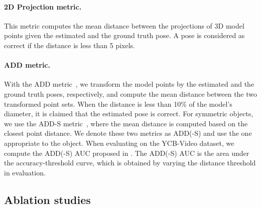 \documentclass[10pt,twocolumn,letterpaper]{article}
\begin{document}
\paragraph{2D Projection metric.} This metric computes the mean distance between the projections of 3D model points given the estimated and the ground truth pose. A pose is considered as correct if the distance is less than 5 pixels.

\paragraph{ADD metric.} With the ADD metric~\cite{hinterstoisser2012model}, we transform the model points by the estimated and the ground truth poses, respectively, and compute the mean distance between the two transformed point sets. When the distance is less than 10\% of the model's diameter, it is claimed that the estimated pose is correct. For symmetric objects, we use the ADD-S metric~\cite{xiang2017posecnn}, where the mean distance is computed based on the closest point distance. We denote these two metrics as ADD(-S) and use the one appropriate to the object. When evaluating on the YCB-Video dataset, we compute the ADD(-S) AUC proposed in \cite{xiang2017posecnn}. The ADD(-S) AUC is the area under the accuracy-threshold curve, which is obtained by varying the distance threshold in evaluation.

\subsection{Ablation studies}
\label{sec:ablation studies}
\end{document}
